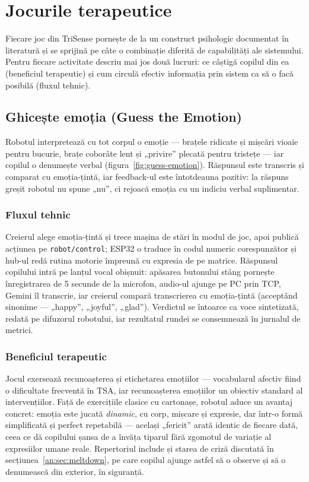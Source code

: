 \section{Jocurile terapeutice}

Fiecare joc din TriSense pornește de la un construct psihologic documentat în literatură și se sprijină pe câte o combinație diferită de capabilități ale sistemului. Pentru fiecare activitate descriu mai jos două lucruri: ce câștigă copilul din ea (beneficiul terapeutic) și cum circulă efectiv informația prin sistem ca să o facă posibilă (fluxul tehnic).

\subsection{Ghicește emoția (Guess the Emotion)}

Robotul interpretează cu tot corpul o emoție — brațele ridicate și mișcări vioaie pentru bucurie, brațe coborâte lent și „privire” plecată pentru tristețe — iar copilul o denumește verbal (figura~\ref{fig:guess-emotion}). Răspunsul este transcris și comparat cu emoția-țintă, iar feedback-ul este întotdeauna pozitiv: la răspuns greșit robotul nu spune „nu”, ci rejoacă emoția cu un indiciu verbal suplimentar.

\subsubsection*{Fluxul tehnic}
Creierul alege emoția-țintă și trece mașina de stări în modul de joc, apoi publică acțiunea pe \texttt{robot/control}; ESP32 o traduce în codul numeric corespunzător și hub-ul redă rutina motorie împreună cu expresia de pe matrice. Răspunsul copilului intră pe lanțul vocal obișnuit: apăsarea butonului stâng pornește înregistrarea de 5 secunde de la microfon, audio-ul ajunge pe PC prin TCP, Gemini îl transcrie, iar creierul compară transcrierea cu emoția-țintă (acceptând sinonime — „happy”, „joyful”, „glad”). Verdictul se întoarce ca voce sintetizată, redată pe difuzorul robotului, iar rezultatul rundei se consemnează în jurnalul de metrici.

\subsubsection*{Beneficiul terapeutic}
Jocul exersează recunoașterea și etichetarea emoțiilor — vocabularul afectiv fiind o dificultate frecventă în TSA, iar recunoașterea emoțiilor un obiectiv standard al intervențiilor. Față de exercițiile clasice cu cartonașe, robotul aduce un avantaj concret: emoția este jucată \emph{dinamic}, cu corp, mișcare și expresie, dar într-o formă simplificată și perfect repetabilă — același „fericit” arată identic de fiecare dată, ceea ce dă copilului șansa de a învăța tiparul fără zgomotul de variație al expresiilor umane reale. Repertoriul include și starea de criză discutată în secțiunea~\ref{an:sec:meltdown}, pe care copilul ajunge astfel să o observe și să o denumească din exterior, în siguranță.

